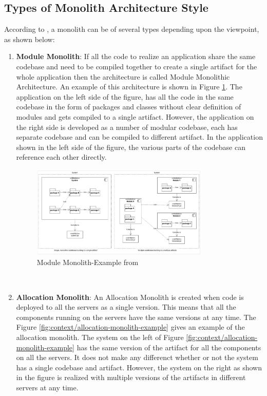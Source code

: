 \subsection{Types of Monolith Architecture Style}\label{subsection:context/monolith-types}
According to \cite{Annett:2014aa}, a monolith can be of several types depending upon the viewpoint, as shown below:
\begin{enumerate}
\item \textbf{Module Monolith}: If all the code to realize an application share the same codebase and need to be compiled together to create a single artifact for the whole application then the architecture is called Module Monolithic Architecture. An example of this architecture is shown in Figure \ref {fig:context/module-monolith-example}. The application on the left side of the figure, has all the code in the same codebase in the form of packages and classes without clear definition of modules and gets compiled to a single artifact. However, the application on the right side is developed as a number of modular codebase, each has separate codebase and can be compiled to different artifact. In the application shown in the left side of the figure, the various parts of the codebase can reference each other directly.
\begin{figure}[H]
\begin{center}
\includegraphics[width=0.8\textwidth]{figures/context-module-monolith}
\caption{Module Monolith-Example from \cite{Annett:2014aa}}
\label{fig:context/module-monolith-example}
\end{center}
\end{figure}
\\
\item \textbf{Allocation Monolith}: An Allocation Monolith is created when code is deployed to all the servers as a single version. This means that all the components running on the servers have the same versions at any time. The Figure \ref{fig:context/allocation-monolith-example} gives an example of the allocation monolith. The system on the left of Figure \ref{fig:context/allocation-monolith-example} has the same version of the artifact for all the components on all the servers. It does not make any differenct whether or not the system has a single codebase and artifact. However, the system on the right as shown in the figure is realized with multiple versions of the artifacts in different servers at any time.

\end{enumerate}
